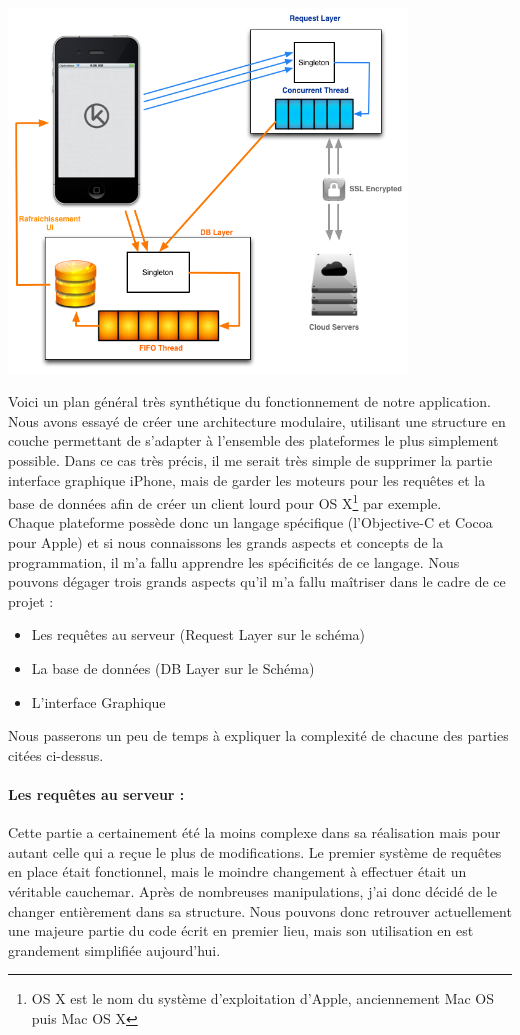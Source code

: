 \documentclass{article}
\begin{document}
\includegraphics[width=400px]{Images/schema_general_simplifie.png}

Voici un plan général très synthétique du fonctionnement de notre application. Nous avons essayé de créer une architecture modulaire, utilisant une structure en couche permettant de s'adapter à l'ensemble des plateformes le plus simplement possible. Dans ce cas très précis, il me serait très simple de supprimer la partie interface graphique iPhone, mais de garder les moteurs pour les requêtes et la base de données afin de créer un client lourd pour OS X\footnote{OS X est le nom du système d'exploitation d'Apple, anciennement Mac OS puis Mac OS X} par exemple.\\

Chaque plateforme possède donc un langage spécifique (l'Objective-C et Cocoa pour Apple) et si nous connaissons les grands aspects et concepts de la programmation, il m'a fallu apprendre les spécificités de ce langage. Nous pouvons dégager trois grands aspects qu'il m'a fallu maîtriser dans le cadre de ce projet : 


\begin{itemize}
	\item Les requêtes au serveur (Request Layer sur le schéma)
	\item La base de données (DB Layer sur le Schéma)
	\item L'interface Graphique\\
\end{itemize}
Nous passerons un peu de temps à expliquer la complexité de chacune des parties citées ci-dessus.
		\paragraph{Les requêtes au serveur :}
		Cette partie a certainement été la moins complexe dans sa réalisation mais pour autant celle qui a  reçue le plus de modifications. Le premier système de requêtes en place était fonctionnel, mais le moindre changement à effectuer était un véritable cauchemar. Après de nombreuses manipulations, j'ai donc décidé de le changer entièrement dans sa structure. Nous pouvons donc retrouver actuellement une majeure partie du code écrit en premier lieu, mais son utilisation en est grandement simplifiée aujourd'hui.\\
		
\end{document}

